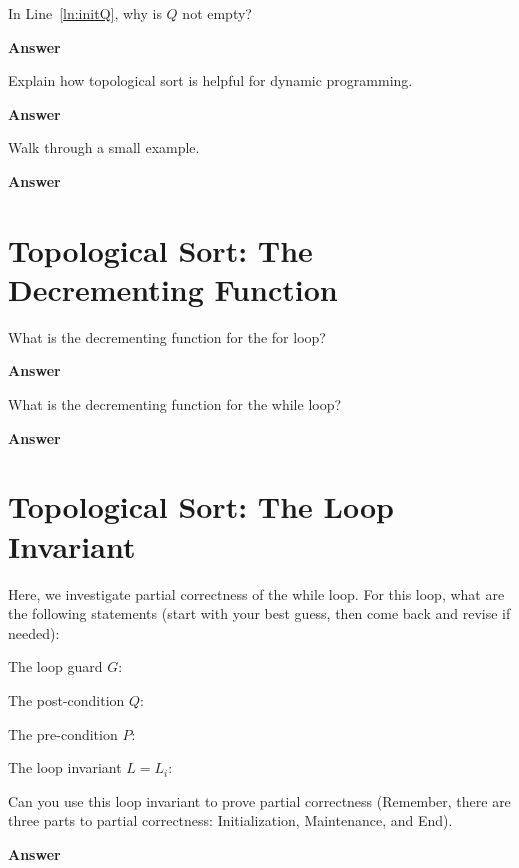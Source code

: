 \documentclass{article}
\begin{document}
\pagebreak
In Line~\ref{ln:initQ}, why is $Q$ not empty?

\textbf{Answer}
\vspace{1in}

Explain how topological sort is helpful for dynamic programming.

\textbf{Answer}
\vspace{1in}

Walk through a small example.

\textbf{Answer}

\pagebreak
\section*{Topological Sort: The Decrementing Function}

What is the decrementing function for the for loop?

\textbf{Answer}
\vspace{1in}

What is the decrementing function for the while loop?

\textbf{Answer}
\vspace{1in}

\section*{Topological Sort: The Loop Invariant}

Here, we investigate partial correctness of the while loop.  For this loop, what
are the following statements (start with your best guess, then come back and
revise if needed):

The loop guard $G$:
\vspace{0.5in}

The post-condition $Q$:
\vspace{0.5in}

The pre-condition $P$:
\vspace{0.5in}

The loop invariant $L=L_i$:
\vspace{0.5in}


Can you use this loop invariant
to prove partial correctness (Remember, there are three parts to partial
correctness: Initialization, Maintenance, and End).

\textbf{Answer}
\vspace{1in}
\end{document}
